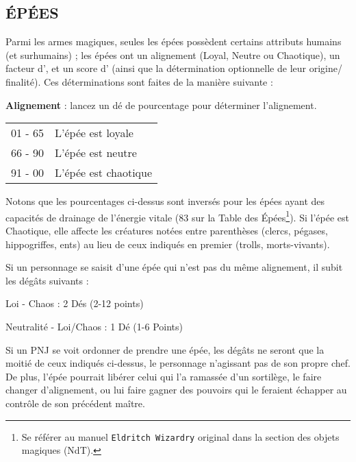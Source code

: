 \documentclass[12pt]{article}
\newcommand{\myunderline}[1]{\underline{\smash{#1}}}
\begin{document}
\subsection*{ÉPÉES}
{\parindent0pt

Parmi les armes magiques, seules les épées possèdent certains attributs humains (et surhumains) ;
les épées ont un alignement (Loyal, Neutre ou Chaotique), un facteur d’\myunderline{intelligence}, et un score d’\myunderline{Ego} (ainsi que la détermination optionnelle de leur origine/ﬁnalité). Ces déterminations sont faites de la manière suivante :

\bigskip

\textbf{Alignement} : lancez un dé de pourcentage pour déterminer l’alignement.

\bigskip

{\parindent2.5cm
\begin{tabular}{p{2.8cm}l}
01 - 65
& L’épée est loyale \\
66 - 90
& L’épée est neutre \\
91 - 00
& L’épée est chaotique \\
\end{tabular}}

\medskip

Notons que les pourcentages ci-dessus sont inversés pour les épées ayant des capacités de drainage de
l’énergie vitale (83 sur la Table des Épées\footnote{Se référer au manuel \texttt{Eldritch Wizardry} original dans la section des objets magiques (NdT).}). Si l’épée est Chaotique, elle affecte les créatures notées entre parenthèses (clercs, pégases,
hippogriffes, ents) au lieu de ceux indiqués en premier (trolls, morts-vivants).

\medskip

Si un personnage se saisit d’une épée qui n’est pas du même alignement, il subit les dégâts suivants :

\medskip

Loi - Chaos : 2 Dés (2-12 points)

Neutralité - Loi/Chaos : 1 Dé (1-6 Points)

\medskip

Si un PNJ se voit ordonner de prendre une épée, les dégâts ne seront que la moitié de ceux indiqués ci-dessus, le personnage n’agissant pas de son propre chef. De plus, l’épée pourrait libérer celui qui l’a ramassée
d’un sortilège, le faire changer d’alignement, ou lui faire gagner des pouvoirs qui le feraient échapper au
contrôle de son précédent maître.

}
\end{document}
